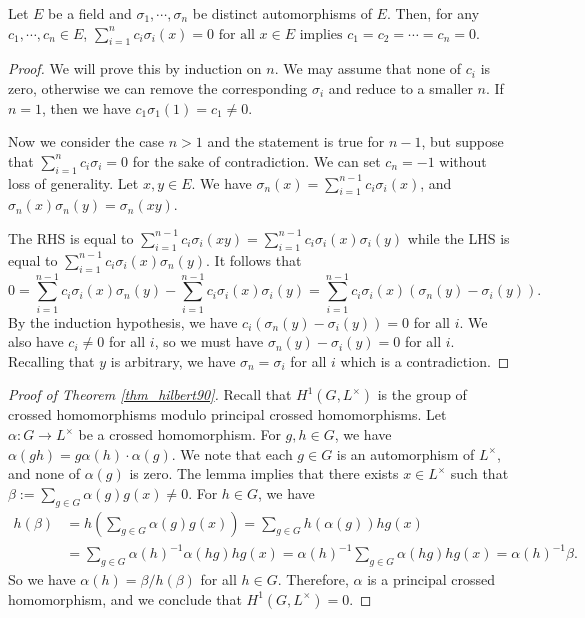 \begin{lemma}
    Let $E$ be a field and $\sigma_1,\cdots, \sigma_n$ be distinct automorphisms of $E$.
    Then, for any $c_1,\cdots, c_n \in E$,
    \(
        \sum_{i=1}^n c_i \sigma_i(x) = 0 \text{ for all } x \in E \text{ implies } c_1 = c_2 = \cdots = c_n = 0.
    \)
\end{lemma}
\begin{proof}
    We will prove this by induction on $n$.
    We may assume that none of $c_i$ is zero, otherwise we can remove the corresponding $\sigma_i$ and reduce to a smaller $n$.
    If $n=1$, then we have $c_1 \sigma_1(1) = c_1 \neq 0$.

    Now we consider the case $n>1$ and the statement is true for $n-1$,
    but suppose that $\sum_{i=1}^{n} c_i \sigma_i = 0$ for the sake of contradiction.
    We can set $c_n = -1$ without loss of generality.
    Let $x, y \in E$.
    We have $\sigma_n(x) = \sum_{i=1}^{n-1} c_i \sigma_i(x)$,
    and $\sigma_n(x)\sigma_n(y) = \sigma_n(xy)$.

    The RHS is equal to $\sum_{i=1}^{n-1} c_i \sigma_i(xy) = \sum_{i=1}^{n-1} c_i \sigma_i(x)\sigma_i(y)$
    while the LHS is equal to $\sum_{i=1}^{n-1} c_i \sigma_i(x)\sigma_n(y)$.
    It follows that
    $$0 = \sum_{i=1}^{n-1} c_i \sigma_i(x)\sigma_n(y) - \sum_{i=1}^{n-1} c_i \sigma_i(x)\sigma_i(y) = \sum_{i=1}^{n-1} c_i \sigma_i(x)(\sigma_n(y) - \sigma_i(y)).$$
    By the induction hypothesis, we have $c_i(\sigma_n(y) - \sigma_i(y)) = 0$ for all $i$.
    We also have $c_i \neq 0$ for all $i$, so we must have $\sigma_n(y) - \sigma_i(y) = 0$ for all $i$.
    Recalling that $y$ is arbitrary, we have $\sigma_n = \sigma_i$ for all $i$ which is a contradiction.
\end{proof}

\begin{proof}[Proof of Theorem \ref{thm_hilbert90}]
    Recall that $H^1(G, L^\times)$ is the group of crossed homomorphisms modulo principal crossed homomorphisms.
    Let $\alpha: G \to L^\times$ be a crossed homomorphism.
    For $g, h \in G$, we have $\alpha(gh) = g \alpha(h)\cdot \alpha(g)$.
    We note that each $g \in G$ is an automorphism of $L^\times$, and none of $\alpha(g)$ is zero.
    The lemma implies that there exists $x \in L^\times$ such that $\beta:=\sum_{g \in G} \alpha(g) g(x) \neq 0$.
    For $h \in G$, we have
    \begin{align*}
        h(\beta) &= h\left(\sum_{g \in G} \alpha(g) g(x)\right)
        = \sum_{g \in G} h(\alpha(g)) hg(x)\\
        &= \sum_{g \in G} \alpha(h)^{-1} \alpha(hg) hg(x)
        = \alpha(h)^{-1} \sum_{g \in G} \alpha(hg) hg(x)
        = \alpha(h)^{-1} \beta.
    \end{align*}
    So we have $\alpha(h) = \beta/h(\beta)$ for all $h \in G$.
    Therefore, $\alpha$ is a principal crossed homomorphism, and we conclude that $H^1(G, L^\times) = 0$.
\end{proof}

